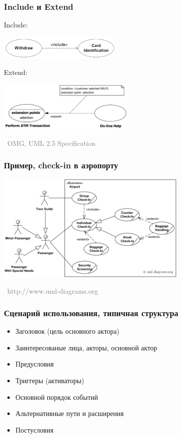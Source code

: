 \documentclass[xetex,mathserif,serif]{beamer}
\newcommand{\attribution}[1] {
    \vspace{-5mm}\begin{flushright}\begin{scriptsize}\textcolor{gray}{\textcopyright\, #1}\end{scriptsize}\end{flushright}
}
\begin{document}
    \begin{frame}
        \frametitle{Include и Extend}
        Include:
        \begin{center}
            \includegraphics[width=0.45\textwidth]{useCaseInclude.png}
        \end{center}
        \vspace{5mm}
        Extend:
        \begin{center}
            \includegraphics[width=0.5\textwidth]{useCaseExtend.png}
        \end{center}
        \attribution{OMG, UML 2.5 Specification}
    \end{frame}

    \begin{frame}
        \frametitle{Пример, check-in в аэропорту}
        \begin{center}
            \includegraphics[width=0.7\textwidth]{airportUseCase.png}
            \attribution{http://www.uml-diagrams.org}
        \end{center}
    \end{frame}

    \begin{frame}
        \frametitle{Сценарий использования, типичная структура}
        \begin{itemize}
            \item Заголовок (цель основного актора)
            \item Заинтересованые лица, акторы, основной актор
            \item Предусловия
            \item Триггеры (активаторы)
            \item Основной порядок событий
            \item Альтернативные пути и расширения
            \item Постусловия
        \end{itemize}
    \end{frame}
\end{document}
